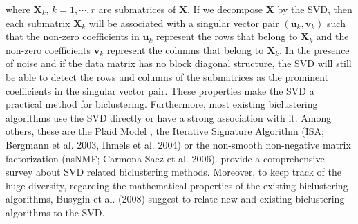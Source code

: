 where $\mathbf{X}_{k}$, $k=1,\cdots,r$ are submatrices of $\mathbf{X}$. If we decompose $\mathbf{X}$ by the SVD, then each submatrix $\mathbf{X}_{k}$ will be associated with a singular vector pair $(\mathbf{u}_{k},\mathbf{v}_{k})$ such that the non-zero coefficients in $\mathbf{u}_{k}$ represent the rows that belong to $\mathbf{X}_{k}$ and the non-zero coefficients $\mathbf{v}_{k}$ represent the columns that belong to $\mathbf{X}_{k}$. In the presence of noise and if the data matrix has no block diagonal structure, the SVD will still be able to detect the rows and columns of the submatrices as the prominent coefficients in the singular vector pair. These properties make the SVD a practical method for biclustering. Furthermore, most existing biclustering algorithms use the SVD directly or have a strong association with it. Among others, these are the Plaid Model \cite{Lazzeroni2000}, the Iterative Signature Algorithm (ISA; Bergmann et al. 2003, Ihmels et al. 2004) or the non-smooth non-negative matrix factorization (nsNMF; Carmona-Saez et al. 2006). \citet{Busygin2008} provide a comprehensive survey about SVD related biclustering methods. Moreover, to keep track of the huge diversity, regarding the mathematical properties of the existing biclustering algorithms, Busygin et al. (2008) suggest to relate new and existing biclustering algorithms to the SVD. 
    

